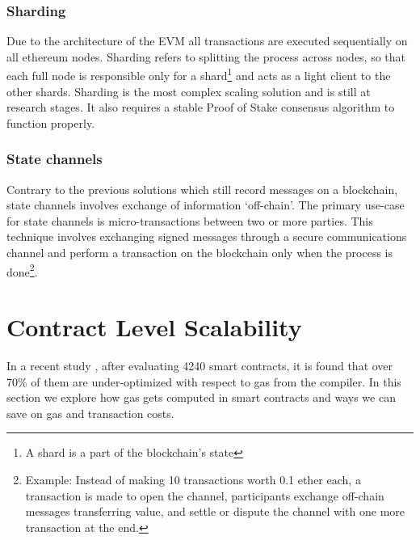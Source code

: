 \subsubsection{Sharding}
Due to the architecture of the EVM all transactions are executed sequentially on all ethereum nodes. Sharding refers to splitting the process across nodes, so that each full node is responsible only for a shard\footnote{A shard is a part of the blockchain's state} and acts as a light client to the other shards. Sharding is the most complex scaling solution and is still at research stages. It also requires a stable Proof of Stake consensus algorithm to function properly.

\subsubsection{State channels}
Contrary to the previous solutions which still record messages on a blockchain, state channels involves exchange of information `off-chain'. The primary use-case for state channels is micro-transactions between two or more parties. This technique involves exchanging signed messages through a secure communications channel and perform a transaction on the blockchain only when the process is done\footnote{Example: Instead of making 10 transactions worth 0.1 ether each, a transaction is made to open the channel, participants exchange off-chain messages transferring value, and settle or dispute the channel with one more transaction at the end.}.
    
\section{Contract Level Scalability}
In a recent study \cite{DBLP:journals/corr/ChenLLZ17}, after evaluating 4240 smart contracts, it is found that over 70\% of them are under-optimized with respect to gas from the compiler. In this section we explore how gas gets computed in smart contracts and ways we can save on gas and transaction costs.


